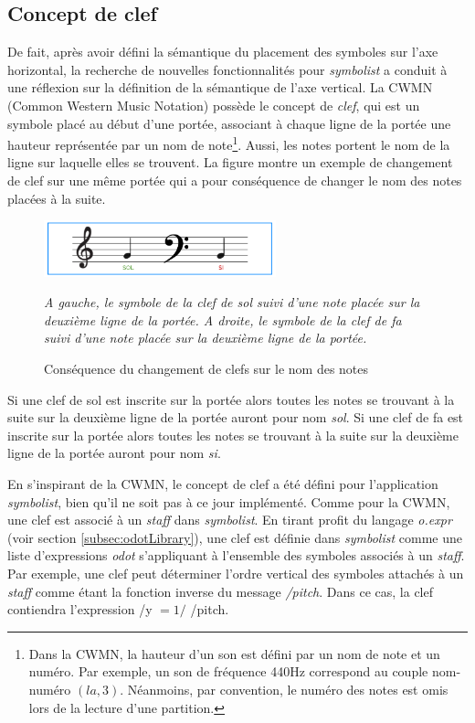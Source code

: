 \subsection{Concept de clef}
\label{subsec:conceptDeClef}
De fait, après avoir défini la sémantique du placement des symboles sur l'axe horizontal, la recherche de nouvelles fonctionnalités pour \textit{symbolist} a conduit à une réflexion sur la définition de la sémantique de l'axe vertical.
La CWMN (Common Western Music Notation) possède le concept de \textit{clef}, qui est un symbole placé au début d'une portée, associant à chaque ligne de la portée une hauteur représentée par un nom de note\footnote{Dans la CWMN, la hauteur d'un son est défini par un nom de note et un numéro. Par exemple, un son de fréquence 440Hz correspond au couple nom-numéro $(la, 3)$. Néanmoins, par convention, le numéro des notes est omis lors de la lecture d'une partition.}.
Aussi, les notes portent le nom de la ligne sur laquelle elles se trouvent.
La figure montre un exemple de changement de clef sur une même portée qui a pour conséquence de changer le nom des notes placées à la suite.
\begin{figure}[H]
	\centering
	\includegraphics[keepaspectratio=true, width=0.6\textwidth]{ModeleDeNotation/i/clefsCWMN.png}
	\caption{Conséquence du changement de clefs sur le nom des notes}
	\label{fig:clefsCWMN}
	\small
	\textit{A gauche, le symbole de la clef de sol suivi d'une note placée sur la deuxième ligne de la portée. A droite, le symbole de la clef de fa suivi d'une note placée sur la deuxième ligne de la portée.}
\end{figure}
Si une clef de sol est inscrite sur la portée alors toutes les notes se trouvant à la suite sur la deuxième ligne de la portée auront pour nom \textit{sol}. Si une clef de fa est inscrite sur la portée alors toutes les notes se trouvant à la suite sur la deuxième ligne de la portée auront pour nom \textit{si}.

En s'inspirant de la CWMN, le concept de clef a été défini pour l'application \textit{symbolist}, bien qu'il ne soit pas à ce jour implémenté. Comme pour la CWMN, une clef est associé à un \textit{staff} dans \textit{symbolist}. En tirant profit du langage \textit{o.expr} (voir section \ref{subsec:odotLibrary}), une clef est définie dans \textit{symbolist} comme une liste d'expressions \textit{odot} s'appliquant à l'ensemble des symboles associés à un \textit{staff}.
 Par exemple, une clef peut déterminer l'ordre vertical des symboles attachés à un \textit{staff} comme étant la fonction inverse du message \textit{/pitch}. Dans ce cas, la clef contiendra l'expression  /y $= 1 /$ /pitch.

